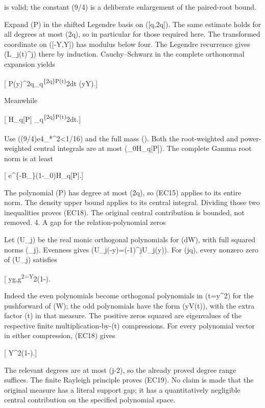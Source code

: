 is valid; the constant (9/4) is a deliberate enlargement of the paired-root bound.

Expand (P) in the shifted Legendre basis on ({[}q,2q{]}). The same estimate holds for all degrees at most (2q), so in particular for those required here. The transformed coordinate on ({[}-Y,Y{]}) has modulus below four. The Legendre recurrence gives (\textbar L\_j(t)\textbar{}\^{}j) there by induction. Cauchy--Schwarz in the complete orthonormal expansion yields

{[} \textbar P(y)\textbar\^{}2\le {}q\int\_q\textsuperscript{\{2q\}\textbar P(t)\textbar{}}2dt \qquad(\textbar y\textbar{}\le Y).{]}

Meanwhile

{[} \mathcal H\_q{[}P{]}\ge {} \int\_q\textsuperscript{\{2q\}\textbar P(t)\textbar{}}2dt.{]}

Use ((9/4)e\textsuperscript{}4\epsilon\_*\^{}2\textless1/16) and the full mass (\sqrt{2\pi}). Both the root-weighted and power-weighted central integrals are at most (\eta\_0\mathcal H\_q{[}P{]}). The complete Gamma root norm is at least

{[} e\^{}\{-B\_\chi\}(1-\eta\_0)\mathcal H\_q{[}P{]}.{]}

The polynomial (\widehat\chi P) has degree at most (2q), so (EC15) applies to its entire norm. The density upper bound applies to its central integral. Dividing those two inequalities proves (EC18). The original central contribution is bounded, not removed. 4. A gap for the relation-polynomial zeros

Let (U\_j) be the real monic orthogonal polynomials for (dW), with full squared norms (\nu\_j). Evenness gives (U\_j(-y)=(-1)\^{}jU\_j(y)). For (j\le q), every nonzero zero of (U\_j) satisfies

{[} \textbar y\textbar{}\ge g,\qquad g\textsuperscript{2=Y}2(1-\eta). \tag{EC19}{]}

Indeed the even polynomials become orthogonal polynomials in (t=y\^{}2) for the pushforward of (W); the odd polynomials have the form (yV(t)), with the extra factor (t) in that measure. The positive zeros squared are eigenvalues of the respective finite multiplication-by-(t) compressions. For every polynomial vector in either compression, (EC18) gives

{[} \ge Y\^{}2(1-\eta).{]}

The relevant degrees are at most (j-2), so the already proved degree range suffices. The finite Rayleigh principle proves (EC19). No claim is made that the original measure has a literal support gap; it has a quantitatively negligible central contribution on the specified polynomial space.

